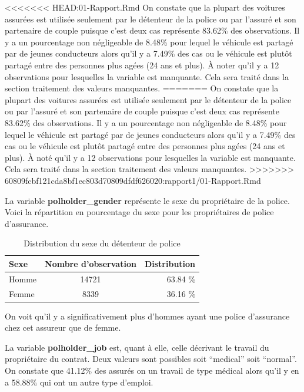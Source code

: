 \documentclass[
]{article}
\begin{document}
\textless\textless\textless\textless\textless\textless\textless{}
HEAD:01-Rapport.Rmd On constate que la plupart des voitures assurées est
utilisée seulement par le détenteur de la police ou par l'assuré et son
partenaire de couple puisque c'est deux cas représente 83.62\% des
observations. Il y a un pourcentage non négligeable de 8.48\% pour
lequel le véhicule est partagé par de jeunes conducteurs alors qu'il y a
7.49\% des cas ou le véhicule est plutôt partagé entre des personnes
plus agées (24 ans et plus). À noter qu'il y a 12 observations pour
lesquelles la variable est manquante. Cela sera traité dans la section
traitement des valeurs manquantes. ======= On constate que la plupart
des voitures assurées est utilisée seulement par le détenteur de la
police ou par l'assuré et son partenaire de couple puisque c'est deux
cas représente 83.62\% des observations. Il y a un pourcentage non
négligeable de 8.48\% pour lequel le véhicule est partagé par de jeunes
conducteurs alors qu'il y a 7.49\% des cas ou le véhicule est plutôt
partagé entre des personnes plus agées (24 ans et plus). À noté qu'il y
a 12 observations pour lesquelles la variable est manquante. Cela sera
traité dans la section traitement des valeurs manquantes.
\textgreater\textgreater\textgreater\textgreater\textgreater\textgreater\textgreater{}
60809fcbf121cda8bf1ec803d70809dfdf626020:rapport1/01-Rapport.Rmd

La variable \textbf{polholder\_gender} représente le sexe du
propriétaire de la police. Voici la répartition en pourcentage du sexe
pour les propriétaires de police d'assurance.

\begin{table}[ht]
\centering
\caption{Distribution du sexe du détenteur de police} 
\label{tbl:polholderGender}
\begin{tabular}{lcr}
  \hline
Sexe & Nombre d'observation & Distribution \\ 
  \hline
Homme & 14721 & 63.84 \% \\ 
  Femme & 8339 & 36.16 \% \\ 
   \hline
\end{tabular}
\end{table}

On voit qu'il y a significativement plus d'hommes ayant une police
d'assurance chez cet assureur que de femme.

La variable \textbf{polholder\_job} est, quant à elle, celle décrivant
le travail du propriétaire du contrat. Deux valeurs sont possibles soit
``medical'' soit ``normal''. On constate que 41.12\% des assurés on un
travail de type médical alors qu'il y en a 58.88\% qui ont un autre type
d'emploi.
\end{document}
